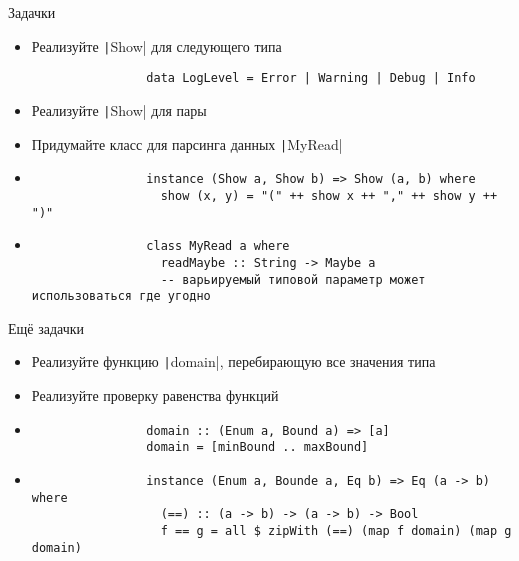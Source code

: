     \begin{frame}[fragile]{Задачки}
        \begin{itemize}
            \item[\todo] Реализуйте \texttt|Show| для следующего типа
            \begin{verbatim}
                data LogLevel = Error | Warning | Debug | Info
            \end{verbatim}
            \item[\todo] Реализуйте \texttt|Show| для пары
            \item[\todo] Придумайте класс для парсинга данных \texttt|MyRead|
            \item[\answer] \pause
            \begin{verbatim}
                instance (Show a, Show b) => Show (a, b) where
                  show (x, y) = "(" ++ show x ++ "," ++ show y ++ ")"
            \end{verbatim}
            \item[\answer] \pause
            \begin{verbatim}
                class MyRead a where
                  readMaybe :: String -> Maybe a
                  -- варьируемый типовой параметр может использоваться где угодно
            \end{verbatim}
        \end{itemize}
    \end{frame}

    \begin{frame}[fragile]{Ещё задачки}
        \begin{itemize}
            \item[\todo] Реализуйте функцию \texttt|domain|, перебирающую все значения типа
            \item[\todo] Реализуйте проверку равенства функций
            \item[\answer] \pause
            \begin{verbatim}
                domain :: (Enum a, Bound a) => [a]
                domain = [minBound .. maxBound]
            \end{verbatim}
            \item[\answer] \pause
            \begin{verbatim}
                instance (Enum a, Bounde a, Eq b) => Eq (a -> b) where
                  (==) :: (a -> b) -> (a -> b) -> Bool
                  f == g = all $ zipWith (==) (map f domain) (map g domain)
            \end{verbatim}
        \end{itemize}
    \end{frame}

